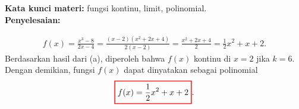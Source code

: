 \documentclass[10pt,openany,a4paper]{article}
\theoremstyle{definition}
\theoremstyle{definition}
\theoremstyle{plain}
\newenvironment{jawab}[2][tes]{
\textbf{Kata kunci materi:} #1.\\
\textbf{Penyelesaian:} #2
}{}
\begin{document}
\begin{enumerate}
\begin{jawab}[fungsi kontinu, limit, polinomial]
{\begin{enumerate}
        \begin{align*}
            f(x) = \frac{x^3 - 8}{2x - 4} = \frac{(x-2)(x^2 + 2x + 4)}{2(x-2)} = \frac{x^2 + 2x + 4}{2} = \frac{1}{2}x^2 + x + 2.
        \end{align*}
        Berdasarkan hasil dari (a), diperoleh bahwa \(f(x)\) kontinu di \(x=2\) jika \(k=6\). Dengan demikian, fungsi \(f(x)\) dapat dinyatakan sebagai polinomial
        \begin{align*}
            \colorlet{oldcolor}{.}
        \color{red}
        \setlength{\fboxrule}{1pt} \boxed{\color{oldcolor}f(x) = \frac{1}{2}x^2 + x + 2}\color{oldcolor}.
        \end{align*}
        \end{enumerate}
    }
        
    \end{jawab}


\end{enumerate}
\end{document}
